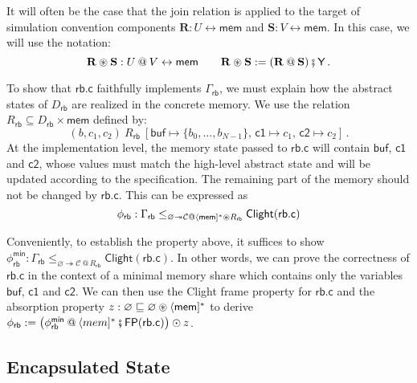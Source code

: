 \documentclass[acmsmall,screen,review,anonymous,nonacm]{acmart}
\newcommand{\kw}[1]{\ensuremath{ \mathsf{#1} }}
\newcommand{\jr}{\mathsf{Y}}
\newcommand{\vcomp}{\fatsemi}
\newcommand{\sepconj}{\oast}
\begin{document}
It will often be the case that the join relation
is applied to the target of
simulation convention components
$\mathbf{R} : U \leftrightarrow \kw{mem}$ and
$\mathbf{S} : V \leftrightarrow \kw{mem}$.
In this case,
we will use the notation:
\[
  \mathbf{R} \sepconj \mathbf{S} : U \mathbin@ V \leftrightarrow \kw{mem}
  \qquad
  \mathbf{R} \sepconj \mathbf{S} :=
  (\mathbf{R} \mathbin@ \mathbf{S}) \vcomp \jr
  \,.
\]


\begin{example} %
To show that $\kw{rb.c}$
faithfully implements $\Gamma_\kw{rb}$,
we must explain how the abstract states of $D_\kw{rb}$
are realized in the concrete memory.
We use the relation
$R_\kw{rb} \subseteq D_\kw{rb} \times \kw{mem}$
defined by:
\[
  (b, c_1, c_2) \: \mathrel{R_\kw{rb}} \:
  [\kw{buf} \mapsto \{b_0, \ldots, b_{N-1}\}, \,
   \kw{c1} \mapsto c_1, \,
   \kw{c2} \mapsto c_2]
  \,.
\]
At the implementation level,
the memory state passed to $\kw{rb.c}$
will contain $\kw{buf}$, $\kw{c1}$ and $\kw{c2}$,
whose values must match the high-level abstract state
and will be updated according to the specification.
The remaining part of the memory should not be changed by $\kw{rb.c}$.
This can be expressed as
\begin{equation} \label{eqn:rbcorrect}
  \phi_\kw{rb} :
  \Gamma_\kw{rb}
  \le_{\varnothing \twoheadrightarrow
       \mathcal{C} \mathbin@
       \langle \kw{mem} ]^* \sepconj R_\kw{rb}}
  \kw{Clight}(\kw{rb.c})
\end{equation}

Conveniently,
to establish the property above,
it suffices to show
$\phi_\kw{rb}^\kw{min} :
  \Gamma_\kw{rb}
  \le_{\varnothing \twoheadrightarrow \mathcal{C} \mathbin@ R_\kw{rb}}
  \kw{Clight}(\kw{rb.c})
$.
In other words,
we can prove the correctness of $\kw{rb.c}$
in the context of a minimal memory share
which contains only the variables $\kw{buf}$, $\kw{c1}$ and $\kw{c2}$.
We can then use the Clight frame property for $\kw{rb.c}$
and the absorption property
$z : \varnothing \sqsubseteq \varnothing \sepconj \langle\kw{mem}]^*$
to derive
$
  \phi_\kw{rb} :=
  \big(
    \phi_\kw{rb}^\kw{min} \mathbin@ \langle mem ]^*
    \vcomp
    \kw{FP}(\kw{rb.c})
  \big) \odot z
$.
\end{example}


\subsection*{Encapsulated State} \label{sec:encap} %
\end{document}

